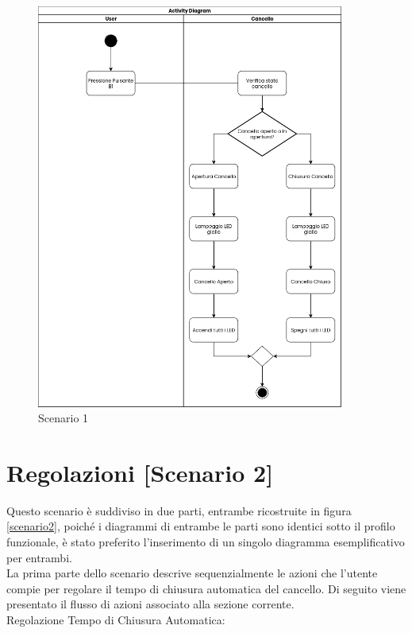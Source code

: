 \begin{figure}[H]
    \centering
    \includegraphics[width=0.9\textwidth]{figures/scenario1.png}
    \caption{Scenario 1}
    \label{scenario1}
\end{figure}


\section{Regolazioni [Scenario 2]}
\noindent Questo scenario è suddiviso in due parti, entrambe ricostruite in figura \ref{scenario2}, poiché i diagrammi di entrambe le parti sono identici sotto il profilo funzionale, è stato preferito l'inserimento di un singolo diagramma esemplificativo per entrambi.\\

La prima parte dello scenario descrive sequenzialmente le azioni che l’utente compie per regolare il tempo di chiusura automatica del cancello.
Di seguito viene presentato il flusso di azioni associato alla sezione corrente. \\

\noindent Regolazione Tempo di Chiusura Automatica:

